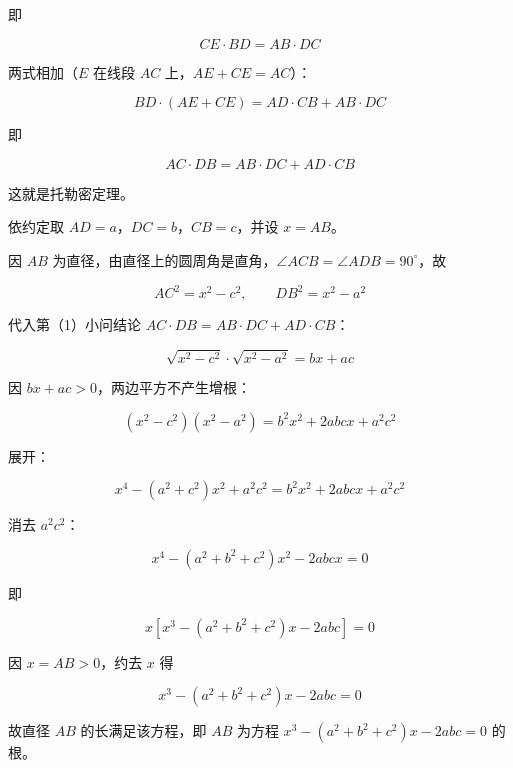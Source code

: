 \begin{answer}
即

\nopagebreak[4]
\[
CE\cdot BD=AB\cdot DC
\]

两式相加（$E$ 在线段 $AC$ 上，$AE+CE=AC$）：

\nopagebreak[4]
\[
BD\cdot(AE+CE)=AD\cdot CB+AB\cdot DC
\]

即

\nopagebreak[4]
\[
AC\cdot DB=AB\cdot DC+AD\cdot CB
\]

这就是托勒密定理。


依约定取 $AD=a$，$DC=b$，$CB=c$，并设 $x=AB$。

因 $AB$ 为直径，由直径上的圆周角是直角，$\angle ACB=\angle ADB=90^{\circ}$，故

\nopagebreak[4]
\[
AC^{2}=x^{2}-c^{2},\qquad DB^{2}=x^{2}-a^{2}
\]

代入第（1）小问结论 $AC\cdot DB=AB\cdot DC+AD\cdot CB$：

\nopagebreak[4]
\[
\sqrt{x^{2}-c^{2}}\cdot\sqrt{x^{2}-a^{2}}=bx+ac
\]

因 $bx+ac>0$，两边平方不产生增根：

\nopagebreak[4]
\[
(x^{2}-c^{2})(x^{2}-a^{2})=b^{2}x^{2}+2abcx+a^{2}c^{2}
\]

展开：

\nopagebreak[4]
\[
x^{4}-(a^{2}+c^{2})x^{2}+a^{2}c^{2}=b^{2}x^{2}+2abcx+a^{2}c^{2}
\]

消去 $a^{2}c^{2}$：

\nopagebreak[4]
\[
x^{4}-(a^{2}+b^{2}+c^{2})x^{2}-2abcx=0
\]

即

\nopagebreak[4]
\[
x\left[x^{3}-(a^{2}+b^{2}+c^{2})x-2abc\right]=0
\]

因 $x=AB>0$，约去 $x$ 得

\nopagebreak[4]
\[
x^{3}-(a^{2}+b^{2}+c^{2})x-2abc=0
\]

故直径 $AB$ 的长满足该方程，即 $AB$ 为方程 $x^{3}-(a^{2}+b^{2}+c^{2})x-2abc=0$ 的根。



\end{answer}